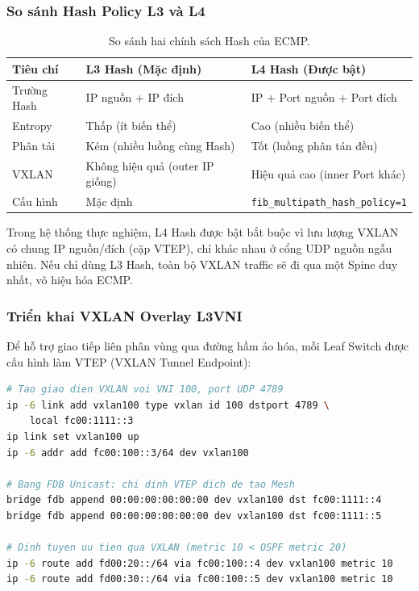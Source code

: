 \subsubsection{So sánh Hash Policy L3 và L4}

\begin{table}[H]
    \centering
    \caption{So sánh hai chính sách Hash của ECMP.}
    \label{tab:hash_comparison}
    \begin{tabular}{|p{3cm}|p{5cm}|p{5cm}|}
        \hline
        \textbf{Tiêu chí} & \textbf{L3 Hash (Mặc định)} & \textbf{L4 Hash (Được bật)} \\
        \hline
        Trường Hash & IP nguồn + IP đích & IP + Port nguồn + Port đích \\
        \hline
        Entropy & Thấp (ít biến thể) & Cao (nhiều biến thể) \\
        \hline
        Phân tải & Kém (nhiều luồng cùng Hash) & Tốt (luồng phân tán đều) \\
        \hline
        VXLAN & Không hiệu quả (outer IP giống) & Hiệu quả cao (inner Port khác) \\
        \hline
        Cấu hình & Mặc định & \texttt{fib\_multipath\_hash\_policy=1} \\
        \hline
    \end{tabular}
\end{table}

Trong hệ thống thực nghiệm, L4 Hash được bật bắt buộc vì lưu lượng VXLAN có chung IP nguồn/đích (cặp VTEP), chỉ khác nhau ở cổng UDP nguồn ngẫu nhiên. Nếu chỉ dùng L3 Hash, toàn bộ VXLAN traffic sẽ đi qua một Spine duy nhất, vô hiệu hóa ECMP.

\subsubsection{Triển khai VXLAN Overlay L3VNI}

Để hỗ trợ giao tiếp liên phân vùng qua đường hầm ảo hóa, mỗi Leaf Switch được cấu hình làm VTEP (VXLAN Tunnel Endpoint):

\begin{lstlisting}[style=customcode, language=bash, caption={Cấu hình VXLAN VNI 100 và bảng FDB trên Leaf S3.}, label=lst:vxlan_config]
# Tao giao dien VXLAN voi VNI 100, port UDP 4789
ip -6 link add vxlan100 type vxlan id 100 dstport 4789 \
    local fc00:1111::3
ip link set vxlan100 up
ip -6 addr add fc00:100::3/64 dev vxlan100

# Bang FDB Unicast: chi dinh VTEP dich de tao Mesh
bridge fdb append 00:00:00:00:00:00 dev vxlan100 dst fc00:1111::4
bridge fdb append 00:00:00:00:00:00 dev vxlan100 dst fc00:1111::5

# Dinh tuyen uu tien qua VXLAN (metric 10 < OSPF metric 20)
ip -6 route add fd00:20::/64 via fc00:100::4 dev vxlan100 metric 10
ip -6 route add fd00:30::/64 via fc00:100::5 dev vxlan100 metric 10
\end{lstlisting}

